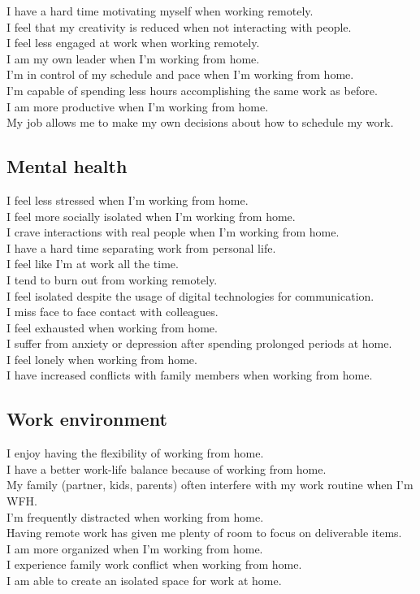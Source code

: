 \documentclass[12pt]{article}
\begin{document}
I have a hard time motivating myself when working remotely. \\
I feel that my creativity is reduced when not interacting with people. \\
I feel less engaged at work when working remotely. \\
I am my own leader when I’m working from home. \\
I’m in control of my schedule and pace when I'm working from home. \\
I’m capable of spending less hours accomplishing the same work as before. \\
I am more productive when I’m working from home.  \\
My job allows me to make my own decisions about how to schedule my work.

\subsection*{Mental health}

I feel less stressed when I’m working from home. \\
I feel more socially isolated when I’m working from home. \\
I crave interactions with real people when I’m working from home. \\
I have a hard time separating work from personal life. \\
I feel like I'm at work all the time.  \\
I tend to burn out from working remotely. \\
I feel isolated despite the usage of digital technologies for communication. \\
I miss face to face contact with colleagues. \\
I feel exhausted when working from home. \\
I suffer from anxiety or depression after spending prolonged periods at home. \\
I feel lonely when working from home. \\
I have increased conflicts with family members when working from home. 

\subsection*{Work environment}

I enjoy having the flexibility of working from home.  \\
I have a better work-life balance because of working from home. \\
My family (partner, kids, parents) often interfere with my work routine when I’m WFH. \\
I’m frequently distracted when working from home.  \\
Having remote work has given me plenty of room to focus on deliverable items.  \\
I am more organized when I’m working from home.  \\
I experience family work conflict when working from home. \\
I am able to create an isolated space for work at home.
\end{document}
